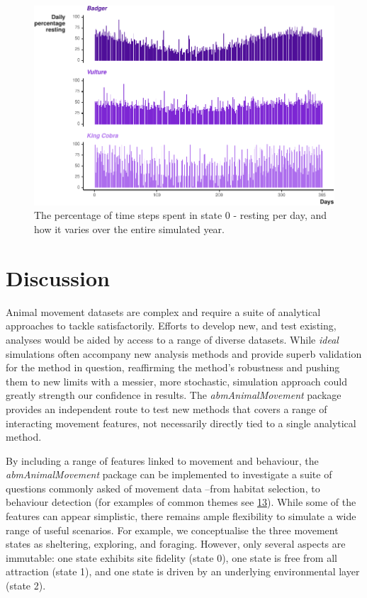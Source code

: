 \documentclass[10pt,a4paper]{article}
\begin{document}
\begin{figure}

{\centering \includegraphics{Agent-based_model_walkthrough_files/figure-latex/cycleSeasonalFigure-1} 

}

\caption{The percentage of time steps spent in state 0 - resting per day, and how it varies over the entire simulated year.}\label{fig:cycleSeasonalFigure}
\end{figure}

\hypertarget{discussion}{%
\section{Discussion}\label{discussion}}

Animal movement datasets are complex and require a suite of analytical approaches to tackle satisfactorily.
Efforts to develop new, and test existing, analyses would be aided by access to a range of diverse datasets.
While \emph{ideal} simulations often accompany new analysis methods and provide superb validation for the method in question, reaffirming the method's robustness and pushing them to new limits with a messier, more stochastic, simulation approach could greatly strength our confidence in results.
The \emph{abmAnimalMovement} package provides an independent route to test new methods that covers a range of interacting movement features, not necessarily directly tied to a single analytical method.

By including a range of features linked to movement and behaviour, the \emph{abmAnimalMovement} package can be implemented to investigate a suite of questions commonly asked of movement data --from habitat selection, to behaviour detection (for examples of common themes see \protect\hyperlink{ref-joo_recent_2022}{13}).
While some of the features can appear simplistic, there remains ample flexibility to simulate a wide range of useful scenarios.
For example, we conceptualise the three movement states as sheltering, exploring, and foraging.
However, only several aspects are immutable: one state exhibits site fidelity (state 0), one state is free from all attraction (state 1), and one state is driven by an underlying environmental layer (state 2).
\end{document}
